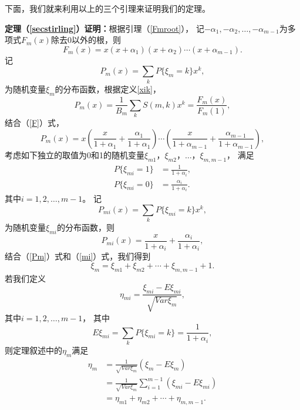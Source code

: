 下面，我们就来利用以上的三个引理来证明我们的定理。

 \noindent
{\bf{定理（\ref{secstirling}）证明：}}根据引理（\ref{Fmroot}），
记$-\alpha_1,-\alpha_2,\ldots,-\alpha_{m-1}$为多项式$F_m(x)$除去0以外的根，则
\begin{equation}\label{F}
F_m(x)=x(x+\alpha_1)(x+\alpha_2)\cdots(x+\alpha_{m-1}).
\end{equation}
记
\begin{equation*}
P_m(x)=\sum\limits_kP\{\xi_m=k\}x^k,
\end{equation*}
为随机变量$\xi_m$的分布函数，根据定义\ref{xik}，
\begin{equation*}
P_m(x)=\frac{1}{B_m}\sum\limits_kS(m,k)x^k=\frac{F_m(x)}{F_m(1)},
\end{equation*}
结合（\ref{F}）式，
\begin{equation}\label{Pm}
P_m(x)=x\left(\frac{x}{1+\alpha_1}+\frac{\alpha_1}{1+\alpha_1}\right)\cdots
\left(\frac{x}{1+\alpha_{m-1}}+\frac{\alpha_{m-1}}{1+\alpha_{m-1}}\right),
\end{equation}
考虑如下独立的取值为0和1的随机变量$\xi_{m1}$，$\xi_{m2}$，$\ldots$，$\xi_{m,m-1}$，
满足
\begin{align*}
P\{\xi_{mi}=1\}&=\frac{1}{1+\alpha_i},\\
P\{\xi_{mi}=0\}&=\frac{\alpha_i}{1+\alpha_i}.
\end{align*}
其中$i=1,2,\ldots,m-1$。 记
\begin{equation*}
P_{mi}(x)=\sum\limits_kP\{\xi_{mi}=k\}x^k,
\end{equation*}
为随机变量$\xi_{mi}$的分布函数，则
\begin{equation}\label{mi}
P_{mi}(x)=\frac{x}{1+\alpha_i}+\frac{\alpha_i}{1+\alpha_i},
\end{equation}
结合（\ref{Pm}）式和（\ref{mi}）式，我们得到
\begin{equation}\label{ximsum}
\xi_m=\xi_{m1}+\xi_{m2}+\cdots+\xi_{m,m-1}+1.
\end{equation}
若我们定义
\begin{equation*}
\eta_{mi}=\frac{\xi_{mi}-E\xi_{mi}}{\sqrt{Var\xi_m}},
\end{equation*}
其中$i=1,2,\ldots,m-1$， 其中
\[
E\xi_{mi}=\sum\limits_kP\{\xi_{mi}=k\}=\frac{1}{1+\alpha_i},
\]
则定理叙述中的$\eta_m$满足
\begin{align*}
\eta_m&=\frac{1}{\sqrt{Var\xi_m}}\left(\xi_m-E\xi_m\right)\\
&=\frac{1}{\sqrt{Var\xi_m}}\sum\limits_{i=1}^{m-1}\left(\xi_{mi}-E\xi_{mi}\right)\\
&=\eta_{m1}+\eta_{m2}+\cdots+\eta_{m,m-1}.
\end{align*}
